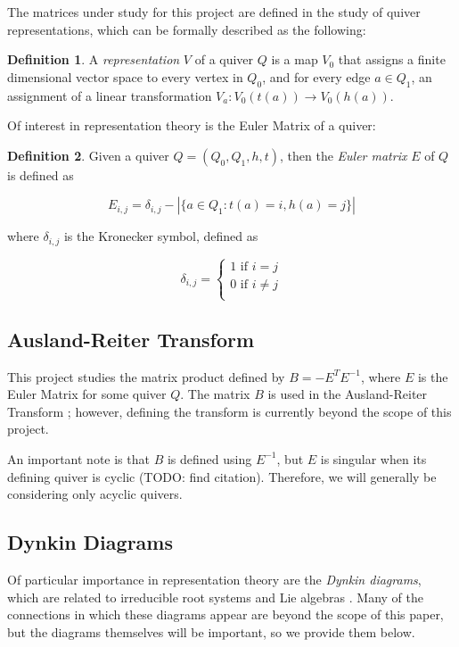 \documentclass{amsart}
\theoremstyle{theorem}
\theoremstyle{theorem*}
\theoremstyle{definition}
\newtheorem{definition}{Definition}
\begin{document}
The matrices under study for this project are defined in the study of quiver
representations, which can be formally described as the following:

\begin{definition} \cite{dw} A \textit{representation} $V$ of a quiver $Q$ is a
    map $V_0$ that assigns a finite dimensional vector space to every vertex in
    $Q_0$, and for every edge $a \in Q_1$, an assignment of a linear
    transformation $V_a : V_0(t(a)) \rightarrow V_0(h(a))$.
\end{definition}

Of interest in representation theory is the Euler Matrix of a quiver:

\begin{definition} \cite{dw} Given a quiver $Q = (Q_0, Q_1, h, t)$, then the
    \textit{Euler matrix} $E$ of $Q$ is defined as

    $$E_{i,j} = \delta_{i,j} - |\{a \in Q_1 : t(a) = i, h(a) = j \}|$$

    where $\delta_{i,j}$ is the Kronecker symbol, defined as

    $$\delta_{i,j} = \begin{cases} 1 \text{ if } i = j \\ 0 \text{ if } i \neq j
            \\\end{cases}$$

\end{definition}

\subsection{Ausland-Reiter Transform}

This project studies the matrix product defined by $B = -E^T E^{-1}$, where $E$
is the Euler Matrix for some quiver $Q$. The matrix $B$ is used in the
Ausland-Reiter Transform \cite{dw}; however, defining the transform is currently
beyond the scope of this project.

An important note is that $B$ is defined using $E^{-1}$, but $E$ is 
singular when its defining quiver is cyclic (TODO: find citation). Therefore, we will
generally be considering only acyclic quivers.

\subsection{Dynkin Diagrams}

Of particular importance in representation theory are the \textit{Dynkin
    diagrams}, which are related to irreducible root systems and Lie algebras
\cite{dw}. Many of the connections in which these diagrams appear are beyond
the scope of this paper, but the diagrams themselves will be important, so
we provide them below.
\end{document}
